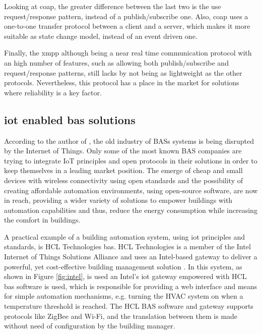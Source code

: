 Looking at \ac{coap}, the greater difference between the last two is the use request/response pattern, instead of a publish/subscribe one. Also, \ac{coap} uses a one-to-one transfer protocol between a client and a server, which makes it more suitable as state change model, instead of an event driven one.

Finally, the \ac{xmpp} although being a near real time communication protocol with an high number of features, such as allowing both publish/subscribe and request/response patterns, still lacks by not being as lightweight as the other protocols. Nevertheless, this protocol has a place in the market for solutions where reliability is a key factor.


\subsection{\ac{iot} enabled \ac{bas} solutions}

According to the author of \cite{TransformativeWave}, the old industry of BASs systems is being disrupted by the Internet of Things. Only some of the most known BAS companies are trying to integrate IoT principles and open protocols in their solutions in order to keep themselves in a leading market position. The emerge of cheap and small devices with wireless connectivity using open standards and the possibility of creating affordable automation environments, using open-source software, are now in reach, providing a wider variety of solutions to empower buildings with automation capabilities and thus, reduce the energy consumption while increasing the comfort in buildings.

A practical example of a building automation system, using \ac{iot} principles and standards, is HCL Technologies \ac{bas}. HCL Technologies is a member of the Intel Internet of Things Solutions Alliance \cite{intel} and uses an Intel-based gateway to deliver a powerful, yet cost-effective building management solution \cite{hcl}. In this system, as shown in Figure \ref{fig:intel}, is used an Intel's \ac{iot} gateway empowered with HCL \ac{bas} software is used, which is responsible for providing a web interface and means for simple automation mechanisms, e.g. turning the HVAC system on when a temperature threshold is reached. The HCL BAS software and gateway supports protocols like ZigBee and Wi-Fi, and the translation between them is made without need of configuration by the building manager.



